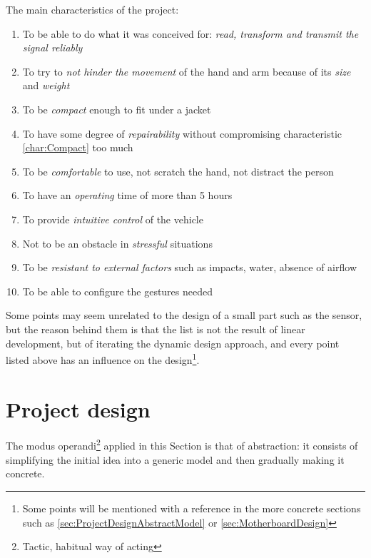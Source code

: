 \documentclass[a4paper, 10pt, final]{article} %
\begin{document}
    \noindent The main characteristics of the project:
    \begin{enumerate}[label=\emph{(\arabic*)}]
        \item To be able to do what it was conceived for: \emph{read, transform and transmit the signal reliably} \label{char:Reliability}
        \item To try to \emph{not hinder the movement} of the hand and arm because of its \emph{size} and \emph{weight} \label{char:CompactNoDriveImpact}
        \item To be \emph{compact} enough to fit under a jacket \label{char:Compact}
        \item To have some degree of \emph{repairability} without compromising characteristic \ref{char:Compact} too much \label{char:Repairability}
        \item To be \emph{comfortable} to use, not scratch the hand, not distract the person \label{char:ComfortableNoPain}
        \item To have an \emph{operating} time of more than 5 hours \label{char:Automaticity}
        \item To provide \emph{intuitive control} of the vehicle \label{char:IntuitiveControl}
        \item Not to be an obstacle in \emph{stressful} situations \label{char:StressReactionAdapted}
        \item To be \emph{resistant to external factors} such as impacts, water, absence of airflow \label{char:ExternalImpactAdapted}
        \item To be able to configure the gestures needed \label{char:GestureVariability}
    \end{enumerate}
    Some points may seem unrelated to the design of a small part such as the sensor, but the reason behind them is that the list is not the result of linear development, but of iterating the dynamic design approach, and every point listed above has an influence on the design\footnote{Some points will be mentioned with a reference in the more concrete sections such as \ref{sec:ProjectDesignAbstractModel} or \ref{sec:MotherboardDesign}}. 

    \section{Project design}\label{sec:ProjectDesign}
    The modus operandi\footnote{Tactic, habitual way of acting} applied in this Section is that of abstraction: it consists of simplifying the initial idea into a generic model and then gradually making it concrete.
\end{document}
